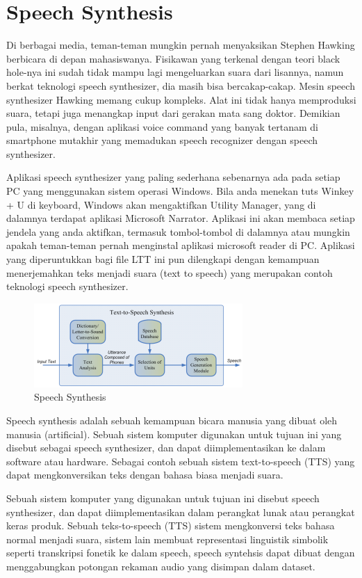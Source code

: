 \section{Speech Synthesis}
Di berbagai media, teman-teman mungkin pernah menyaksikan Stephen Hawking berbicara di depan mahasiswanya. Fisikawan yang terkenal dengan teori black hole-nya ini sudah tidak mampu lagi mengeluarkan suara dari lisannya, namun berkat teknologi speech synthesizer, dia masih bisa bercakap-cakap. Mesin speech synthesizer Hawking memang cukup kompleks. Alat ini tidak hanya memproduksi suara, tetapi juga menangkap input dari gerakan mata sang doktor. Demikian pula, misalnya, dengan aplikasi voice command yang banyak tertanam di smartphone mutakhir yang memadukan speech recognizer dengan speech synthesizer.

Aplikasi speech synthesizer yang paling sederhana sebenarnya ada pada setiap PC yang menggunakan sistem operasi Windows. Bila anda menekan tuts Winkey + U di keyboard, Windows akan mengaktifkan Utility Manager, yang di dalamnya terdapat aplikasi Microsoft Narrator. Aplikasi ini akan membaca setiap jendela yang anda aktifkan, termasuk tombol-tombol di dalamnya atau mungkin apakah teman-teman pernah menginstal aplikasi microsoft reader di PC. Aplikasi yang diperuntukkan bagi file LTT ini pun dilengkapi dengan kemampuan menerjemahkan teks menjadi suara (text to speech) yang merupakan contoh teknologi speech synthesizer.

\begin{figure}[H]
        \centerline{\includegraphics[scale=.75]{figures/speech}}
        \caption{Speech Synthesis}
		\label{speech}
\end{figure}

Speech synthesis adalah sebuah kemampuan bicara manusia yang dibuat oleh manusia (artificial). Sebuah sistem komputer digunakan untuk tujuan ini yang disebut sebagai speech synthesizer, dan dapat diimplementasikan ke dalam software atau hardware. Sebagai contoh sebuah sistem text-to-speech (TTS) yang dapat mengkonversikan teks dengan bahasa biasa menjadi suara.

Sebuah sistem komputer yang digunakan untuk tujuan ini disebut speech synthesizer, dan dapat diimplementasikan dalam perangkat lunak atau perangkat keras produk. Sebuah teks-to-speech (TTS) sistem mengkonversi teks bahasa normal menjadi suara, sistem lain membuat representasi linguistik simbolik seperti transkripsi fonetik ke dalam speech, speech syntehsis dapat dibuat dengan menggabungkan potongan rekaman audio yang disimpan dalam dataset.

